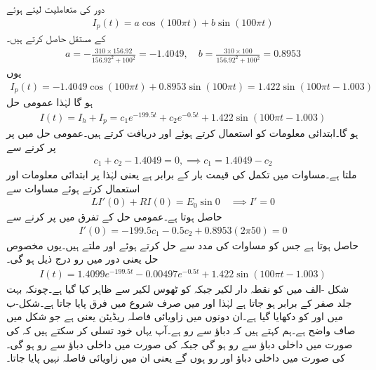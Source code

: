 دور کی متعاملیت  لیتے ہوئے 
\begin{align*}
I_p(t)=a\cos (100\pi t)+b\sin (100\pi t)
\end{align*}
کے مستقل حاصل کرتے ہیں۔
\begin{align*}
a=-\frac{310\times 156.92}{156.92^2+100^2}=-1.4049, \quad b=\frac{310\times 100}{156.92^2+100^2}=0.8953
\end{align*}
یوں 
\begin{align}
I_p(t)=-1.4049\cos (100\pi t)+0.8953\sin (100\pi t)=1.422\sin(100\pi t-1.003)
\end{align}
ہو گا لہٰذا عمومی حل
\begin{align*}
I(t)=I_h+I_p=c_1e^{-199.5t}+c_2e^{-0.5t}+1.422\sin(100\pi t-1.003)
\end{align*}
ہو گا۔ابتدائی معلومات کو استعمال کرتے ہوئے  اور  دریافت کرتے ہیں۔عمومی حل میں  پر  پر کرنے سے 
\begin{align}\label{مساوات_سادہ_دو_متجانس_حل_کا_سر_الف}
c_1+c_2-1.4049=0, \implies c_1=1.4049-c_2
\end{align}
ملتا ہے۔مساوات  میں تکمل کی قیمت بار کے برابر ہے یعنی  لہٰذا  پر ابتدائی معلومات  اور  استعمال کرتے ہوئے مساوات  سے
\begin{align*}
LI'(0)+RI(0)=E_0\sin 0 \quad \implies I'=0
\end{align*}
حاصل ہوتا ہے۔عمومی حل کے تفرق میں  پر کرنے سے
\begin{align*}
I'(0)=-199.5c_1-0.5c_2+0.8953(2\pi 50)=0
\end{align*}
حاصل ہوتا ہے جس کو مساوات  کی مدد سے حل کرتے ہوئے  اور  ملتے ہیں۔یوں مخصوص حل یعنی دور میں رو درج ذیل ہو گی۔
\begin{align*}
I(t)=1.4099e^{-199.5t}-0.00497e^{-0.5t}+1.422\sin(100\pi t-1.003)
\end{align*}
شکل -الف میں  کو نقطہ دار لکیر جبکہ  کو ٹھوس لکیر سے ظاہر کیا گیا ہے۔چونکہ  بہت جلد صفر کے برابر ہو جاتا ہے لہٰذا  اور  میں صرف شروع میں فرق پایا جاتا ہے۔شکل-ب میں  اور  کو دکھایا گیا ہے۔ان دونوں میں زاویائی فاصلہ  ریڈیئن یعنی  ہے جو شکل میں صاف واضح ہے۔ہم کہتے ہیں کہ دباؤ سے رو   ہے۔آپ یہاں خود تسلی کر سکتے ہیں کہ  کی صورت میں داخلی دباؤ سے رو  ہو گی جبکہ   کی صورت میں داخلی دباؤ سے رو  ہو گی۔   کی صورت میں داخلی دباؤ اور رو  ہوں گے یعنی ان میں زاویائی فاصلہ نہیں پایا جاتا۔
